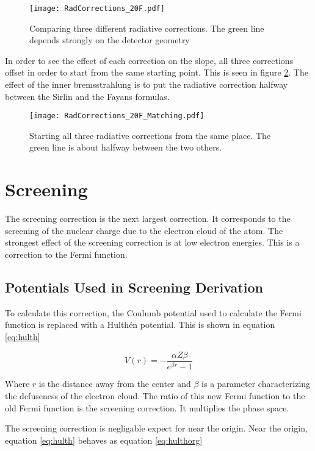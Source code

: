 {\begin{figure}[!htb]
	\centerline{\texttt{[image: RadCorrections\_20F.pdf]}}
	\caption{Comparing three different radiative corrections.
		 The green line depends strongly on the detector geometry}
	\label{fig:rad}
\end{figure}

In order to see the effect of each correction on the slope, all three corrections offset in order to start from the same starting point.
This is seen in figure \ref{fig:radmatch}.
The effect of the inner bremsstrahlung is to put the radiative correction halfway between the Sirlin and the Fayans formulas.

\begin{figure}[!htb]
	\centerline{\texttt{[image: RadCorrections\_20F\_Matching.pdf]}}
	\caption{Starting all three radiative corrections from the same place.	
		 The green line is about halfway between the two others.}
	\label{fig:radmatch}
\end{figure}

\section{Screening}
The screening correction is the next largest correction.
It corresponds to the screening of the nuclear charge due to the electron cloud of the atom.
The strongest effect of the screening correction is at low electron energies.
This is a correction to the Fermi function.

\subsection{Potentials Used in Screening Derivation}
To calculate this correction, the Coulumb potential used to calculate the Fermi function is replaced with a Hulth\'en potential.
This is shown in equation \ref{eq:hulth}

\begin{equation}
	V(r) = -\frac{\alpha Z \beta}{e^{\beta r} - 1}
	\label{eq:hulth}
\end{equation}

Where $r$ is the distance away from the center and $\beta$ is a parameter characterizing the defuseness of the electron cloud.
The ratio of this new Fermi function to the old Fermi function is the screening correction.
It multiplies the phase space. 

The screening correction is negligable expect for near the origin.
Near the origin, equation \ref{eq:hulth} behaves as equation \ref{eq:hulthorg}

}
